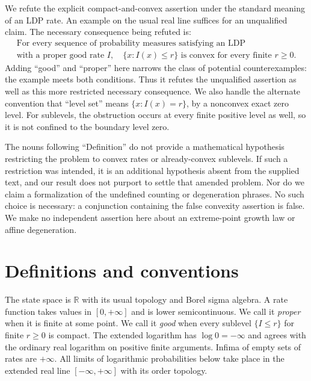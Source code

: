 \documentclass[11pt]{article}
\newcommand{\R}{\mathbb R}
\begin{document}
We refute the explicit compact-and-convex assertion under the standard meaning
of an LDP rate. An example on the usual real line suffices for an unqualified
claim. The necessary consequence being refuted is:
\begin{equation}\label{eq:claim}
\begin{gathered}
\text{For every sequence of probability measures satisfying an LDP}\\
\text{with a proper good rate }I,\quad
\{x:I(x)\le r\}\text{ is convex for every finite }r\ge0.
\end{gathered}
\end{equation}
Adding ``good'' and ``proper'' here narrows the class of potential
counterexamples: the example meets both conditions. Thus it refutes the
unqualified assertion as well as this more restricted necessary consequence.
We also handle the alternate convention that ``level set'' means
$\{x:I(x)=r\}$, by a nonconvex exact zero level. For sublevels, the obstruction
occurs at every finite positive level as well, so it is not confined to the
boundary level zero.

The nouns following ``Definition'' do not provide a mathematical hypothesis
restricting the problem to convex rates or already-convex sublevels. If such
a restriction was intended, it is an additional hypothesis absent from the
supplied text, and our result does not purport to settle that amended problem.
Nor do we claim a formalization of the undefined counting or degeneration
phrases. No such choice is necessary: a conjunction containing the false
convexity assertion is false. We make no independent assertion here about an
extreme-point growth law or affine degeneration.

\section{Definitions and conventions}

The state space is $\R$ with its usual topology and Borel sigma algebra.
A rate function takes values in $[0,+\infty]$ and is lower semicontinuous.
We call it \emph{proper} when it is finite at some point. We call it
\emph{good} when every sublevel $\{I\le r\}$ for finite $r\ge0$ is compact.
The extended logarithm has $\log 0=-\infty$ and agrees with the ordinary real
logarithm on positive finite arguments. Infima of empty sets of rates are
$+\infty$. All limits of logarithmic probabilities below take place in the
extended real line $[-\infty,+\infty]$ with its order topology.
\end{document}
